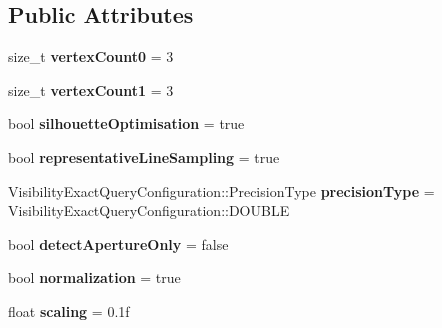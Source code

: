 \subsection*{Public Attributes}
\begin{DoxyCompactItemize}
\item 
\mbox{\label{structvisilib_demo_1_1_demo_configuration_a7f3cc795b055878d519810a41b1b094b}} 
size\+\_\+t {\bfseries vertex\+Count0} = 3
\item 
\mbox{\label{structvisilib_demo_1_1_demo_configuration_a0a841f2d4c100c3bec3040aa12586dc1}} 
size\+\_\+t {\bfseries vertex\+Count1} = 3
\item 
\mbox{\label{structvisilib_demo_1_1_demo_configuration_acf57c3317421a396458a6e11bf794507}} 
bool {\bfseries silhouette\+Optimisation} = true
\item 
\mbox{\label{structvisilib_demo_1_1_demo_configuration_adc3505d66f7318838ece4d792fa34d26}} 
bool {\bfseries representative\+Line\+Sampling} = true
\item 
\mbox{\label{structvisilib_demo_1_1_demo_configuration_a32955ab7019ff21933b9b4b8a8e0bf0e}} 
Visibility\+Exact\+Query\+Configuration\+::\+Precision\+Type {\bfseries precision\+Type} = Visibility\+Exact\+Query\+Configuration\+::\+D\+O\+U\+B\+LE
\item 
\mbox{\label{structvisilib_demo_1_1_demo_configuration_ad43895b3e56ce139f5842412eb362622}} 
bool {\bfseries detect\+Aperture\+Only} = false
\item 
\mbox{\label{structvisilib_demo_1_1_demo_configuration_a77c04af12c9ddb4a69fc0c2b95462bd7}} 
bool {\bfseries normalization} = true
\item 
\mbox{\label{structvisilib_demo_1_1_demo_configuration_a23956566d74fc54554f6d0d411900cd1}} 
float {\bfseries scaling} = 0.\+1f
\item 
\mbox{\label{structvisilib_demo_1_1_demo_configuration_ad0c4bf5d68d895eaecc5a0e821a0b862}} 

\end{DoxyCompactItemize}

